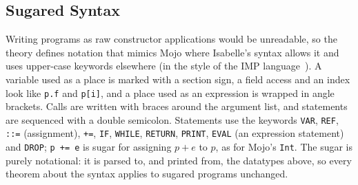 \documentclass[11pt,a4paper]{article}
\newcommand{\code}[1]{\texttt{#1}}
\begin{document}
\subsection{Sugared Syntax}
Writing programs as raw constructor applications would be unreadable, so the
theory defines notation that mimics Mojo where Isabelle's syntax allows it and uses
upper-case keywords elsewhere (in the style of the IMP language~\cite{concrete-semantics}).
A variable used as a place is marked with a section sign, a field access and an index look
like \code{p.f} and \code{p[i]}, and a place used as an expression is wrapped in
angle brackets. Calls are written with braces around the argument list, and
statements are sequenced with a double semicolon. Statements use the keywords
\code{VAR}, \code{REF}, \code{::=} (assignment), \code{+=}, \code{IF}, \code{WHILE},
\code{RETURN}, \code{PRINT}, \code{EVAL} (an expression statement) and \code{DROP};
\code{p += e} is sugar for assigning $p + e$ to $p$, as for Mojo's \code{Int}.
The sugar is purely notational: it is parsed to, and printed from, the datatypes
above, so every theorem about the syntax applies to sugared programs unchanged.
\end{document}
